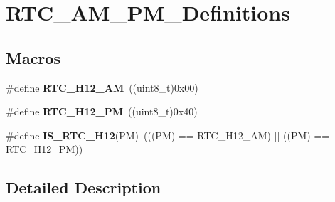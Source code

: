 \hypertarget{group___r_t_c___a_m___p_m___definitions}{}\section{R\+T\+C\+\_\+\+A\+M\+\_\+\+P\+M\+\_\+\+Definitions}
\label{group___r_t_c___a_m___p_m___definitions}
\subsection*{Macros}
\begin{DoxyCompactItemize}
\item 
\hypertarget{group___r_t_c___a_m___p_m___definitions_ga86861d15dab24bfbf2ea9c1aec7b492f}{}\#define {\bfseries R\+T\+C\+\_\+\+H12\+\_\+\+A\+M}~((uint8\+\_\+t)0x00)\label{group___r_t_c___a_m___p_m___definitions_ga86861d15dab24bfbf2ea9c1aec7b492f}

\item 
\hypertarget{group___r_t_c___a_m___p_m___definitions_ga82a5381a1d266841a7fb75820dcad5de}{}\#define {\bfseries R\+T\+C\+\_\+\+H12\+\_\+\+P\+M}~((uint8\+\_\+t)0x40)\label{group___r_t_c___a_m___p_m___definitions_ga82a5381a1d266841a7fb75820dcad5de}

\item 
\hypertarget{group___r_t_c___a_m___p_m___definitions_ga98f8d66c8fed6039f9a58d78b8c512b5}{}\#define {\bfseries I\+S\+\_\+\+R\+T\+C\+\_\+\+H12}(P\+M)~(((P\+M) == R\+T\+C\+\_\+\+H12\+\_\+\+A\+M) $\vert$$\vert$ ((P\+M) == R\+T\+C\+\_\+\+H12\+\_\+\+P\+M))\label{group___r_t_c___a_m___p_m___definitions_ga98f8d66c8fed6039f9a58d78b8c512b5}

\end{DoxyCompactItemize}


\subsection{Detailed Description}
